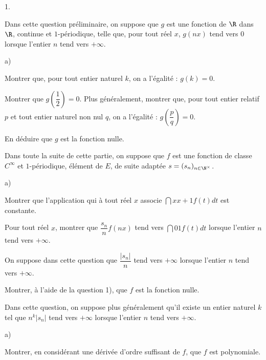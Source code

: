 \documentclass[11pt]{article}%
\begin{document}
\begin{noliste}{1.}
 \setlength{\itemsep}{4mm}
\item Dans cette question préliminaire, on suppose que $g$ est une
fonction
de $\R$ dans $\R$, continue et $1$-périodique, telle que,
pour tout réel $x$, $g(nx)$ tend vers $0$ lorsque l'entier $n$ tend
vers $ + \infty $.

\begin{noliste}{a)}
 \setlength{\itemsep}{2mm}
\item Montrer que, pour tout entier naturel $k$, on a l'égalité : $g(k)
= 0$.

\item Montrer que $g(\dfrac{1}{2}) = 0$. Plus généralement, montrer
que, pour
tout entier relatif $p$ et tout entier naturel non nul $q$, on a
l'égalité :
$g(\dfrac{p}{q}) = 0$.

\item En déduire que $g$ est la fonction nulle.
\end{noliste}

\noindent Dans toute la suite de cette partie, on suppose que $f$ est
une
fonction de classe $C^{\infty }$ et $1$-périodique, élément de $E$, de
suite
adaptée $s = (s_{n})_{n\in \N^{\times }}$.

\item 

\begin{noliste}{a)}
 \setlength{\itemsep}{2mm}
\item Montrer que l'application qui à tout réel $x$ associe $\dint{x}{x
+ 1}f(t)dt$ est constante.

\item Pour tout réel $x$, montrer que $\dfrac{s_{n}}{n}f(nx)$ tend vers
$\dint{0}{1}f(t)dt$ lorsque l'entier $n$ tend vers $ + \infty $.
\end{noliste}

\item On suppose dans cette question que $\dfrac{\left| s_{n}\right|
}{n}$ tend vers $ + \infty $ lorsque l'entier $n$ tend vers $ + \infty
$.

Montrer, à l'aide de la question 1), que $f$ est la fonction nulle.

\item Dans cette question, on suppose plus généralement qu'il existe un
entier naturel $k$ tel que $n^{k}\left| s_{n}\right| $ tend vers $ +
\infty $ lorsque l'entier $n$ tend vers $ + \infty $.

\begin{noliste}{a)}
 \setlength{\itemsep}{2mm}
\item Montrer, en considérant une dérivée d'ordre suffisant de $f$, que
$f$
est polynomiale.


\end{noliste}
\end{noliste}
\end{document}
